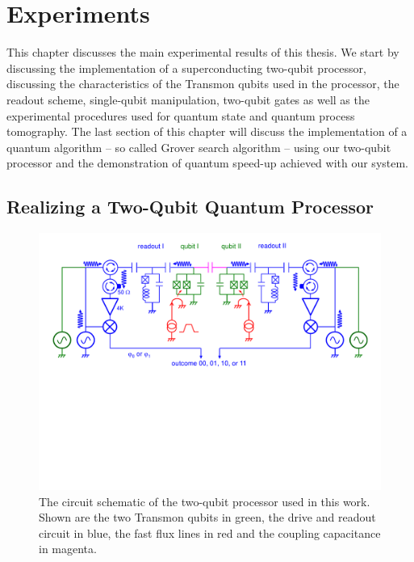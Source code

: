 
\chapter{Experiments}

This chapter discusses the main experimental results of this thesis. We start by discussing the implementation of a superconducting two-qubit processor, discussing the characteristics of the Transmon qubits used in the processor, the readout scheme, single-qubit manipulation, two-qubit gates as well as the experimental procedures used for quantum state and quantum process tomography. The last section of this chapter will discuss the implementation of a quantum algorithm -- so called Grover search algorithm -- using our two-qubit processor and the demonstration of quantum speed-up achieved with our system.


\section{Realizing a Two-Qubit Quantum Processor}

\begin{figure}[ht!]
  \centering
	\includegraphics[width=1.\textwidth]{"./material/figures/2-qubit-processor/processor schematic"}
	\caption[Circuit schematic of the two-qubit processor]{The circuit schematic of the two-qubit processor used in this work. Shown are the two Transmon qubits in green, the drive and readout circuit in blue, the fast flux lines in red and the coupling capacitance in magenta.}
	\label{fig:2_qubit_chip_circuit_diagram}
\end{figure}


